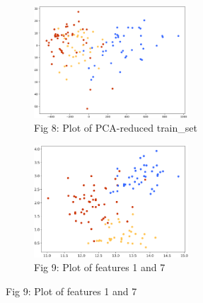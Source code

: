 \documentclass[10pt]{article}
\begin{document}
\begin{figure}[h!]
\captionsetup[subfigure]{labelformat=empty}
\begin{subfigure}{.5\textwidth}
\centering
\includegraphics[height=4.2cm]{pca.png}
\caption{Fig 8: Plot of PCA-reduced train\_set}
\end{subfigure}%
\begin{subfigure}{.5\textwidth}
\centering
\includegraphics[height=4.2cm]{1and7.png}
\caption{Fig 9: Plot of features 1 and 7}
\end{subfigure}%
\end{figure}
\noindent
\end{document}
